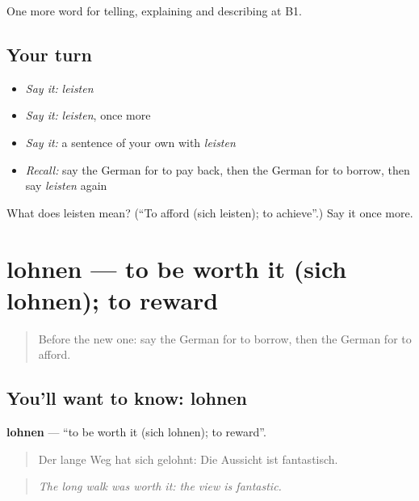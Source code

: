 \begin{grammarlens}[title={What you've built}]
One more word for telling, explaining and describing at B1.
\end{grammarlens}

\subsection*{Your turn}
\begin{itemize}
\raggedright
  \item \emph{Say it:} \emph{leisten}
  \item \emph{Say it:} \emph{leisten}, once more
  \item \emph{Say it:} a sentence of your own with \emph{leisten}
  \item \emph{Recall:} say the German for to pay back, then the German for to borrow, then say \emph{leisten} again
\end{itemize}

\begin{tcolorbox}[breakable,colback=teal!4,colframe=teal!35!black,title={Before you move on}]
What does leisten mean? (\textquotedblleft{}To afford (sich leisten); to achieve\textquotedblright{}.) Say it once more.
\end{tcolorbox}
\section[lohnen]{lohnen — to be worth it (sich lohnen); to reward}

\label{lesson:GE-C389-lohnen}



\begin{quote}
Before the new one: say the German for to borrow, then the German for to afford.
\end{quote}

\subsection*{You'll want to know: lohnen}
\textbf{lohnen} — \textquotedblleft{}to be worth it (sich lohnen); to reward\textquotedblright{}.

\begin{quote}
Der lange Weg hat sich gelohnt: Die Aussicht ist fantastisch.
\end{quote}

\begin{quote}
\emph{The long walk was worth it: the view is fantastic.}
\end{quote}

